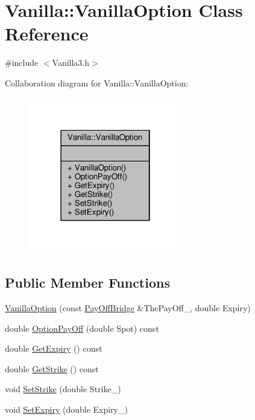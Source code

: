 \hypertarget{classVanilla_1_1VanillaOption}{}\section{Vanilla\+:\+:Vanilla\+Option Class Reference}
\label{classVanilla_1_1VanillaOption}


{\ttfamily \#include $<$Vanilla3.\+h$>$}



Collaboration diagram for Vanilla\+:\+:Vanilla\+Option\+:
\nopagebreak
\begin{figure}[H]
\begin{center}
\leavevmode
\includegraphics[width=190pt]{classVanilla_1_1VanillaOption__coll__graph}
\end{center}
\end{figure}
\subsection*{Public Member Functions}
\begin{DoxyCompactItemize}
\item 
\hyperlink{classVanilla_1_1VanillaOption_a8e282ec5b974f93f9e4c5e13d6b5b4f5}{Vanilla\+Option} (const \hyperlink{classPayOffBridge}{Pay\+Off\+Bridge} \&The\+Pay\+Off\+\_\+, double Expiry)
\item 
double \hyperlink{classVanilla_1_1VanillaOption_a5ad16d96edf31d179fab561ae87adb4a}{Option\+Pay\+Off} (double Spot) const
\item 
double \hyperlink{classVanilla_1_1VanillaOption_a44567e6d20a534387d82e81e52ed5f8d}{Get\+Expiry} () const
\item 
double \hyperlink{classVanilla_1_1VanillaOption_a04d12609adfccf000de7a3fe16d58b13}{Get\+Strike} () const
\item 
void \hyperlink{classVanilla_1_1VanillaOption_a57f58eb1c19bb0940d2f56e85b76e8e6}{Set\+Strike} (double Strike\+\_\+)
\item 
void \hyperlink{classVanilla_1_1VanillaOption_a6a7940405fa36f38a0f10573433b82bb}{Set\+Expiry} (double Expiry\+\_\+)
\end{DoxyCompactItemize}


